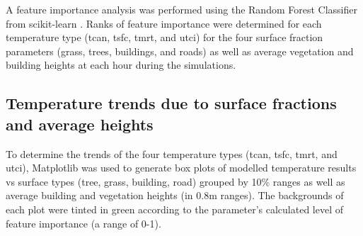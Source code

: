\documentclass[final,3p,times,authoryear]{elsarticle}
\begin{document}
A feature importance analysis was performed using the Random Forest Classifier from  scikit-learn \citep{scikit-learn}. Ranks of feature importance were determined for each temperature type (\gls{tcan}, \gls{tsfc}, \gls{tmrt}, and \gls{utci}) for the four surface fraction parameters (grass, trees, buildings, and roads) as well as average vegetation and building heights at each hour during the simulations.


\subsection{Temperature trends due to surface fractions and average heights}\label{sec:methodstempvspercent}

%

To determine the trends of the four temperature types (\gls{tcan}, \gls{tsfc}, \gls{tmrt}, and \gls{utci}), Matplotlib \citep{Hunter2007} was used to generate box plots of modelled temperature results vs surface types (tree, grass, building, road) grouped by 10\% ranges as well as average building and vegetation heights (in 0.8m ranges). The backgrounds of each plot were tinted in green according to the parameter's calculated level of feature importance (a range of 0-1).
\end{document}
